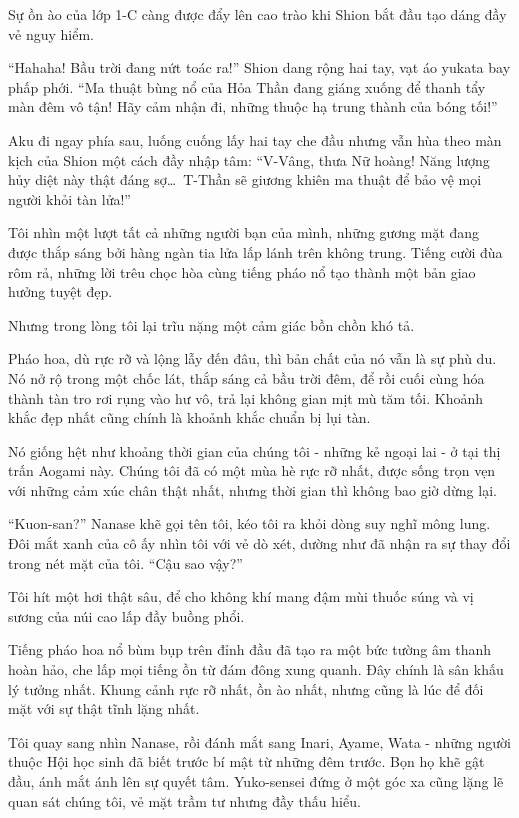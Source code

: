 \documentclass[../main.tex]{subfiles}
\begin{document}
Sự ồn ào của lớp 1-C càng được đẩy lên cao trào khi Shion bắt đầu tạo dáng đầy vẻ nguy hiểm.

``Hahaha! Bầu trời đang nứt toác ra!'' Shion dang rộng hai tay, vạt áo yukata bay phấp phới. ``Ma thuật bùng nổ của Hỏa Thần đang giáng xuống để thanh tẩy màn đêm vô tận! Hãy cảm nhận đi, những thuộc hạ trung thành của bóng tối!''

Aku đi ngay phía sau, luống cuống lấy hai tay che đầu nhưng vẫn hùa theo màn kịch của Shion một cách đầy nhập tâm: ``V-Vâng, thưa Nữ hoàng! Năng lượng hủy diệt này thật đáng sợ\dots\ T-Thần sẽ giương khiên ma thuật để bảo vệ mọi người khỏi tàn lửa!''

Tôi nhìn một lượt tất cả những người bạn của mình, những gương mặt đang được thắp sáng bởi hàng ngàn tia lửa lấp lánh trên không trung. Tiếng cười đùa rôm rả, những lời trêu chọc hòa cùng tiếng pháo nổ tạo thành một bản giao hưởng tuyệt đẹp.

Nhưng trong lòng tôi lại trĩu nặng một cảm giác bồn chồn khó tả.

Pháo hoa, dù rực rỡ và lộng lẫy đến đâu, thì bản chất của nó vẫn là sự phù du. Nó nở rộ trong một chốc lát, thắp sáng cả bầu trời đêm, để rồi cuối cùng hóa thành tàn tro rơi rụng vào hư vô, trả lại không gian mịt mù tăm tối. Khoảnh khắc đẹp nhất cũng chính là khoảnh khắc chuẩn bị lụi tàn.

Nó giống hệt như khoảng thời gian của chúng tôi - những kẻ ngoại lai - ở tại thị trấn Aogami này. Chúng tôi đã có một mùa hè rực rỡ nhất, được sống trọn vẹn với những cảm xúc chân thật nhất, nhưng thời gian thì không bao giờ dừng lại.

``Kuon-san?'' Nanase khẽ gọi tên tôi, kéo tôi ra khỏi dòng suy nghĩ mông lung. Đôi mắt xanh của cô ấy nhìn tôi với vẻ dò xét, dường như đã nhận ra sự thay đổi trong nét mặt của tôi. ``Cậu sao vậy?''

Tôi hít một hơi thật sâu, để cho không khí mang đậm mùi thuốc súng và vị sương của núi cao lấp đầy buồng phổi.

Tiếng pháo hoa nổ bùm bụp trên đỉnh đầu đã tạo ra một bức tường âm thanh hoàn hảo, che lấp mọi tiếng ồn từ đám đông xung quanh. Đây chính là sân khấu lý tưởng nhất. Khung cảnh rực rỡ nhất, ồn ào nhất, nhưng cũng là lúc để đối mặt với sự thật tĩnh lặng nhất.

Tôi quay sang nhìn Nanase, rồi đánh mắt sang Inari, Ayame, Wata - những người thuộc Hội học sinh đã biết trước bí mật từ những đêm trước. Bọn họ khẽ gật đầu, ánh mắt ánh lên sự quyết tâm. Yuko-sensei đứng ở một góc xa cũng lặng lẽ quan sát chúng tôi, vẻ mặt trầm tư nhưng đầy thấu hiểu.
\end{document}
